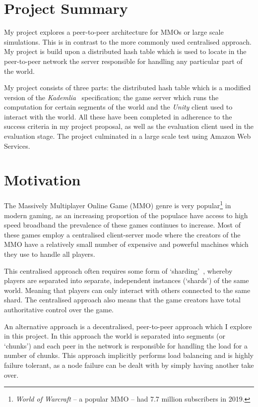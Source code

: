 \documentclass[10pt,twoside,notitlepage,a4paper]{report}
\newcommand{\unity}{\emph{Unity}}
\newcommand{\kademlia}{\emph{Kademlia}}
\begin{document}
	\section{Project Summary}
	My project explores a peer-to-peer architecture for MMOs or large scale simulations. This is in contrast to the more commonly used centralised approach. My project is build upon a distributed hash table which is used to locate in the peer-to-peer network the server responsible for handling any particular part of the world.
	
	My project consists of three parts: the distributed hash table which is a modified version of the \kademlia{}~\cite{kademlia} specification; the game server which runs the computation for certain segments of the world and the \unity{} client used to interact with the world. All these have been completed in adherence to the success criteria in my project proposal, as well as the evaluation client used in the evaluation stage. The project culminated in a large scale test using Amazon Web Services.
	
	\section{Motivation}
	The Massively Multiplayer Online Game (MMO) genre is very popular\footnote{\emph{World of Warcraft} -- a popular MMO -- had 7.7 million subscribers in 2019.} in modern gaming, as an increasing proportion of the populace have access to high speed broadband the prevalence of these games continues to increase. Most of these games employ a centralised client-server mode where the creators of the MMO have a relatively small number of expensive and powerful machines which they use to handle all players.
	
	This centralised approach often requires some form of `sharding'~\cite{shard}, whereby players are separated into separate, independent instances (`shards') of the same world. Meaning that players can only interact with others connected to the same shard. The centralised approach also means that the game creators have total authoritative control over the game.
	
	An alternative approach is a decentralised, peer-to-peer approach which I explore in this project. In this approach the world is separated into segments (or `chunks') and each peer in the network is responsible for handling the load for a number of chunks. This approach implicitly performs load balancing and is highly failure tolerant, as a node failure can be dealt with by simply having another take over.
	
\end{document}
